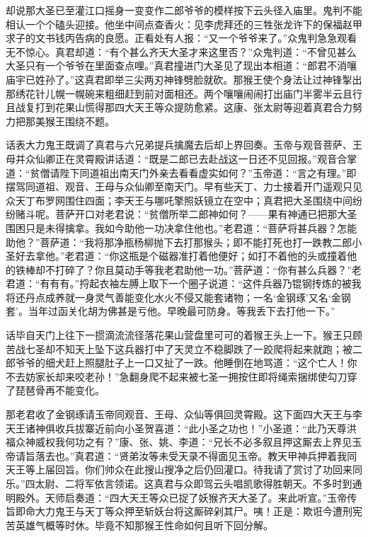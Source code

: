 \documentclass[12pt,UTF8]{ctexbook}
\begin{document}
{却说那大圣已至灌江口摇身一变变作二郎爷爷的模样按下云头径入庙里。鬼判不能相认一个个磕头迎接。他坐中间点查香火：见李虎拜还的三牲张龙许下的保福赵甲求子的文书钱丙告病的良愿。正看处有人报：“又一个爷爷来了。”众鬼判急急观看无不惊心。真君却道：“有个甚么齐天大圣才来这里否？”众鬼判道：“不曾见甚么大圣只有一个爷爷在里面查点哩。”真君撞进门大圣见了现出本相道：“郎君不消嚷庙宇已姓孙了。”这真君即举三尖两刃神锋劈脸就砍。那猴王使个身法让过神锋掣出那绣花针儿幌一幌碗来粗细赶到前对面相还。两个嚷嚷闹闹打出庙门半雾半云且行且战复打到花果山慌得那四大天王等众提防愈紧。这康、张太尉等迎着真君合力努力把那美猴王围绕不题。

话表大力鬼王既调了真君与六兄弟提兵擒魔去后却上界回奏。玉帝与观音菩萨、王母并众仙卿正在灵霄殿讲话道：“既是二郎已去赴战这一日还不见回报。”观音合掌道：“贫僧请陛下同道祖出南天门外亲去看看虚实如何？”玉帝道：“言之有理。”即摆驾同道祖、观音、王母与众仙卿至南天门。早有些天丁、力士接着开门遥观只见众天丁布罗网围住四面；李天王与哪吒擎照妖镜立在空中；真君把大圣围绕中间纷纷赌斗呢。菩萨开口对老君说：“贫僧所举二郎神如何？——果有神通已把那大圣围困只是未得擒拿。我如今助他一功决拿住他也。”老君道：“菩萨将甚兵器？怎能助他？”菩萨道：“我将那净瓶杨柳抛下去打那猴头；即不能打死也打一跌教二郎小圣好去拿他。”老君道：“你这瓶是个磁器准打着他便好；如打不着他的头或撞着他的铁棒却不打碎了？你且莫动手等我老君助他一功。”菩萨道：“你有甚么兵器？”老君道：“有有有。”捋起衣袖左膊上取下一个圈子说道：“这件兵器乃锟钢抟炼的被我将还丹点成养就一身灵气善能变化水火不侵又能套诸物；一名‘金钢琢’又名‘金钢套’。当年过函关化胡为佛甚是亏他。早晚最可防身。等我丢下去打他一下。”

话毕自天门上往下一掼滴流流径落花果山营盘里可可的着猴王头上一下。猴王只顾苦战七圣却不知天上坠下这兵器打中了天灵立不稳脚跌了一跤爬将起来就跑；被二郎爷爷的细犬赶上照腿肚子上一口又扯了一跌。他睡倒在地骂道：“这个亡人！你不去妨家长却来咬老孙！”急翻身爬不起来被七圣一拥按住即将绳索捆绑使勾刀穿了琵琶骨再不能变化。

那老君收了金钢琢请玉帝同观音、王母、众仙等俱回灵霄殿。这下面四大天王与李天王诸神俱收兵拔寨近前向小圣贺喜道：“此小圣之功也！”小圣道：“此乃天尊洪福众神威权我何功之有？”康、张、姚、李道：“兄长不必多叙且押这厮去上界见玉帝请旨落去也。”真君道：“贤弟汝等未受天录不得面见玉帝。教天甲神兵押着我同天王等上届回旨。你们帅众在此搜山搜净之后仍回灌口。待我请了赏讨了功回来同乐。”四太尉、二将军依言领诺。这真君与众即驾云头唱凯歌得胜朝天。不多时到通明殿外。天师启奏道：“四大天王等众已捉了妖猴齐天大圣了。来此听宣。”玉帝传旨即命大力鬼王与天丁等众押至斩妖台将这厮碎剁其尸。咦！正是：欺诳今遭刑宪苦英雄气概等时休。毕竟不知那猴王性命如何且听下回分解。

}
\end{document}
